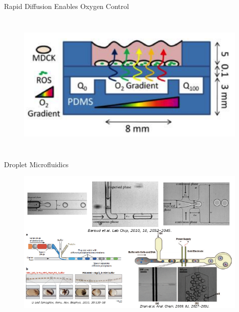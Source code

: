 \documentclass{beamer}
\begin{document}
\begin{frame}{Rapid Diffusion Enables Oxygen Control}
\begin{columns}[c]
\begin{figure}
\includegraphics[width=0.7\linewidth]{images/lo2.png}\\
\hspace*{11pt}\hbox{\scriptsize {}}
\end{figure}
\end{columns}
\end{frame}

\begin{frame}{Droplet Microfluidics}


\begin{figure}
\includegraphics[width=1\linewidth]{images/droplets.png}
\end{figure}
\end{frame}
\end{document}
